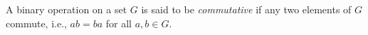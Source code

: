 A binary operation on a set $G$ is said to be \textit{commutative} if any two elements of $G$ commute, i.e., $ab = ba$ for all $a, b \in G$.
